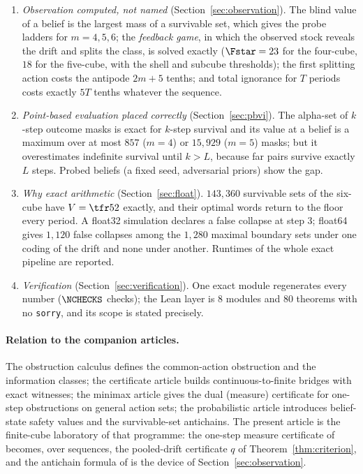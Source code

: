\begin{enumerate}[leftmargin=2em,itemsep=1pt]
\item \emph{Observation computed, not named} (Section~\ref{sec:observation}). The blind value of a belief is the largest mass of a survivable set, which gives the probe ladders for $m=4,5,6$; the \emph{feedback game}, in which the observed stock reveals the drift and splits the class, is solved exactly ($\Fstar=23$ for the four-cube, $18$ for the five-cube, with the shell and subcube thresholds); the first splitting action costs the antipode $2m+5$ tenths; and total ignorance for $T$ periods costs exactly $5T$ tenths whatever the sequence.
\item \emph{Point-based evaluation placed correctly} (Section~\ref{sec:pbvi}). The alpha-set of $k$-step outcome masks is exact for $k$-step survival and its value at a belief is a maximum over at most $857$ ($m=4$) or $15{,}929$ ($m=5$) masks; but it overestimates indefinite survival until $k>L$, because far pairs survive exactly $L$ steps. Probed beliefs (a fixed seed, adversarial priors) show the gap.
\item \emph{Why exact arithmetic} (Section~\ref{sec:float}). $143{,}360$ survivable sets of the six-cube have $V=\tfr52$ exactly, and their optimal words return to the floor every period. A float32 simulation declares a false collapse at step $3$; float64 gives $1{,}120$ false collapses among the $1{,}280$ maximal boundary sets under one coding of the drift and none under another. Runtimes of the whole exact pipeline are reported.
\item \emph{Verification} (Section~\ref{sec:verification}). One exact module regenerates every number ($\NCHECKS$ checks); the Lean layer is $8$ modules and $80$ theorems with no \texttt{sorry}, and its scope is stated precisely.
\end{enumerate}

\paragraph{Relation to the companion articles.}
The obstruction calculus \cite{Abaee2026calc} defines the common-action obstruction and the information classes; the certificate article \cite{Abaee2026cert} builds continuous-to-finite bridges with exact witnesses; the minimax article \cite{Abaee2026minimax} gives the dual (measure) certificate for one-step obstructions on general action sets; the probabilistic article \cite{Abaee2026prob} introduces belief-state safety values and the survivable-set antichains. The present article is the finite-cube laboratory of that programme: the one-step measure certificate of \cite{Abaee2026minimax} becomes, over sequences, the pooled-drift certificate $q$ of Theorem~\ref{thm:criterion}, and the antichain formula of \cite{Abaee2026prob} is the device of Section~\ref{sec:observation}.

